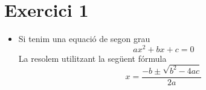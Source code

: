 \section{Exercici 1}\label{sec:Exercici1}
\begin{itemize}
\item Si tenim una equació de segon grau \\ 
\begin{equation}
ax^2 + bx + c = 0 
\end{equation} 
La resolem utilitzant la següent fórmula
\begin{equation}
x = \frac{-b \pm \sqrt{b^2 - 4ac}}{2a}
\end{equation}
\end{itemize}